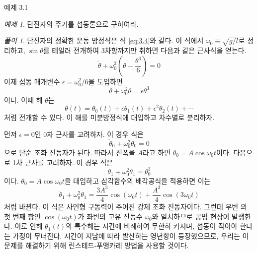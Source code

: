 \documentclass[chapter, oneside, b5paper]{oblivoir}
\theoremstyle{plain}
\theoremstyle{definition}
\theoremstyle{remark}
\newtheorem{example}{예제}[chapter]    %
\newtheorem*{solution}{풀이}
\begin{document}
\begin{examplebox}{예제 3.1}
\begin{example}
단진자의 주기를 섭동론으로 구하여라.
\end{example}
\end{examplebox}

\begin{solution}
    단진자의 정확한 운동 방정식은 식 \ref{eq:3.4}와 같다. 이 식에서 $\omega_0 \equiv \sqrt{g/l}$로 정리하고, $\sin{\theta}$를 테일러 전개하여 3차항까지만 취하면 다음과 같은 근사식을 얻는다.
    \begin{equation}
        \ddot{\theta}+\omega_0^2\left(\theta-\frac{\theta^3}{6} \right) = 0
    \end{equation}
    이제 섭동 매개변수 $\epsilon=\omega_0^2 / 6$을 도입하면
    \begin{equation}
        \ddot{\theta}+\omega_0^2 \theta = \epsilon\theta^3
    \end{equation}
    이다. 이때 해 $\theta$는
    \begin{equation}
        \theta(t) = \theta_0(t)+\epsilon \theta_1(t) + \epsilon^2 \theta_2(t) + \cdots
    \end{equation}처럼 전개할 수 있다. 이 해를 미분방정식에 대입하고 차수별로 분리하자.
    
    먼저 $\epsilon=0$인 0차 근사를 고려하자. 이 경우 식은
    \begin{equation}
        \ddot{\theta}_0+\omega_0^2 \theta_0 = 0
    \end{equation}
    으로 단순 조화 진동자가 된다. 따라서 진폭을 $A$라고 하면 $\theta_0=A\cos{\omega_0 t}$이다. 다음으로 1차 근사를 고려하자. 이 경우 식은
    \begin{equation}
        \ddot{\theta}_1 + \omega_0^2 \theta_1 = \theta_0^3
    \end{equation}이다. $\theta_0=A\cos{\omega_0 t}$을 대입하고 삼각함수의 배각공식을 적용하면 이는
    \begin{equation}
        \ddot{\theta}_1 + \omega_0^2 \theta_1 = \frac{3A^3}{4}\cos{(\omega_0 t)} + \frac{A^3}{4}\cos{(3\omega_0t)}
    \end{equation}
    처럼 바뀐다. 이 식은 사인형 구동력이 주어진 강제 조화 진동자이다. 그런데 우변 의 첫 번째 항인 $\cos{(\omega_0 t)}$가 좌변의 고유 진동수 $\omega_0$와 일치하므로 공명 현상이 발생한다. 이로 인해 $\theta_1(t)$의 특수해는 시간에 비례하여 무한히 커지며, 섭동이 작아야 한다는 가정이 무너진다. 시간이 지남에 따라 발산하는 영년항이 등장했으므로, 우리는 이 문제를 해결하기 위해 린스테드-푸앵카레 방법을 사용할 것이다.
    

\end{solution}
\end{document}
